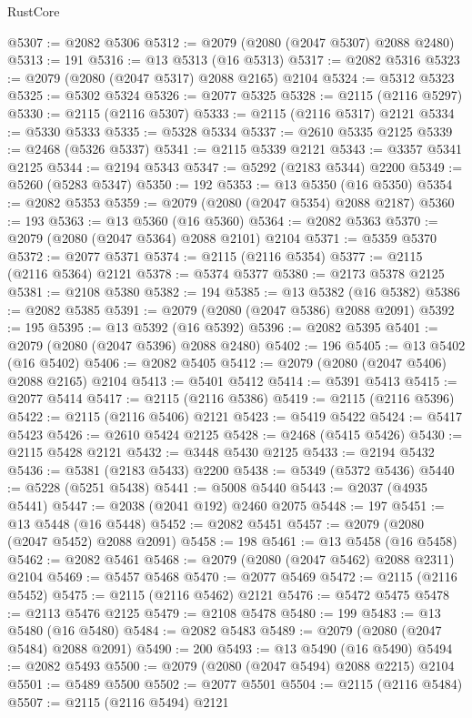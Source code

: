\begin{lexlean}{RustCore}
\begin{coremodule}
@5307 := @2082 @5306
@5312 := @2079 (@2080 (@2047 @5307) @2088 @2480)
@5313 := 191
@5316 := @13 @5313 (@16 @5313)
@5317 := @2082 @5316
@5323 := @2079 (@2080 (@2047 @5317) @2088 @2165) @2104
@5324 := @5312 @5323
@5325 := @5302 @5324
@5326 := @2077 @5325
@5328 := @2115 (@2116 @5297)
@5330 := @2115 (@2116 @5307)
@5333 := @2115 (@2116 @5317) @2121
@5334 := @5330 @5333
@5335 := @5328 @5334
@5337 := @2610 @5335 @2125
@5339 := @2468 (@5326 @5337)
@5341 := @2115 @5339 @2121
@5343 := @3357 @5341 @2125
@5344 := @2194 @5343
@5347 := @5292 (@2183 @5344) @2200
@5349 := @5260 (@5283 @5347)
@5350 := 192
@5353 := @13 @5350 (@16 @5350)
@5354 := @2082 @5353
@5359 := @2079 (@2080 (@2047 @5354) @2088 @2187)
@5360 := 193
@5363 := @13 @5360 (@16 @5360)
@5364 := @2082 @5363
@5370 := @2079 (@2080 (@2047 @5364) @2088 @2101) @2104
@5371 := @5359 @5370
@5372 := @2077 @5371
@5374 := @2115 (@2116 @5354)
@5377 := @2115 (@2116 @5364) @2121
@5378 := @5374 @5377
@5380 := @2173 @5378 @2125
@5381 := @2108 @5380
@5382 := 194
@5385 := @13 @5382 (@16 @5382)
@5386 := @2082 @5385
@5391 := @2079 (@2080 (@2047 @5386) @2088 @2091)
@5392 := 195
@5395 := @13 @5392 (@16 @5392)
@5396 := @2082 @5395
@5401 := @2079 (@2080 (@2047 @5396) @2088 @2480)
@5402 := 196
@5405 := @13 @5402 (@16 @5402)
@5406 := @2082 @5405
@5412 := @2079 (@2080 (@2047 @5406) @2088 @2165) @2104
@5413 := @5401 @5412
@5414 := @5391 @5413
@5415 := @2077 @5414
@5417 := @2115 (@2116 @5386)
@5419 := @2115 (@2116 @5396)
@5422 := @2115 (@2116 @5406) @2121
@5423 := @5419 @5422
@5424 := @5417 @5423
@5426 := @2610 @5424 @2125
@5428 := @2468 (@5415 @5426)
@5430 := @2115 @5428 @2121
@5432 := @3448 @5430 @2125
@5433 := @2194 @5432
@5436 := @5381 (@2183 @5433) @2200
@5438 := @5349 (@5372 @5436)
@5440 := @5228 (@5251 @5438)
@5441 := @5008 @5440
@5443 := @2037 (@4935 @5441)
@5447 := @2038 (@2041 @192) @2460 @2075
@5448 := 197
@5451 := @13 @5448 (@16 @5448)
@5452 := @2082 @5451
@5457 := @2079 (@2080 (@2047 @5452) @2088 @2091)
@5458 := 198
@5461 := @13 @5458 (@16 @5458)
@5462 := @2082 @5461
@5468 := @2079 (@2080 (@2047 @5462) @2088 @2311) @2104
@5469 := @5457 @5468
@5470 := @2077 @5469
@5472 := @2115 (@2116 @5452)
@5475 := @2115 (@2116 @5462) @2121
@5476 := @5472 @5475
@5478 := @2113 @5476 @2125
@5479 := @2108 @5478
@5480 := 199
@5483 := @13 @5480 (@16 @5480)
@5484 := @2082 @5483
@5489 := @2079 (@2080 (@2047 @5484) @2088 @2091)
@5490 := 200
@5493 := @13 @5490 (@16 @5490)
@5494 := @2082 @5493
@5500 := @2079 (@2080 (@2047 @5494) @2088 @2215) @2104
@5501 := @5489 @5500
@5502 := @2077 @5501
@5504 := @2115 (@2116 @5484)
@5507 := @2115 (@2116 @5494) @2121

\end{coremodule}
\end{lexlean}

